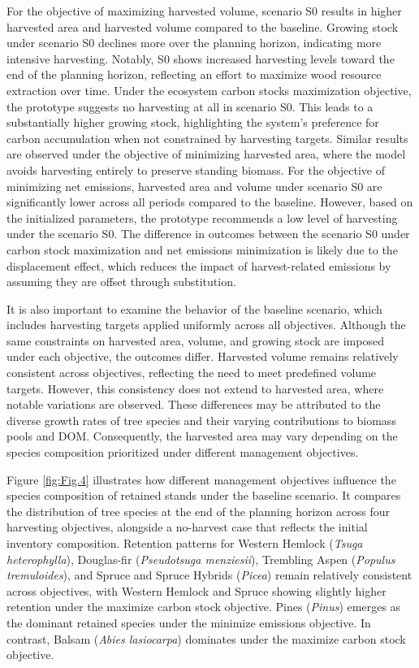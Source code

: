 \documentclass[preprint,12pt]{elsarticle}
\begin{document}
For the objective of maximizing harvested volume, scenario S0 results in higher harvested area and harvested volume compared to the baseline. Growing stock under scenario S0 declines more over the planning horizon, indicating more intensive harvesting. Notably, S0 shows increased harvesting levels toward the end of the planning horizon, reflecting an effort to maximize wood resource extraction over time. Under the ecosystem carbon stocks maximization objective, the prototype suggests no harvesting at all in scenario S0. This leads to a substantially higher growing stock, highlighting the system’s preference for carbon accumulation when not constrained by harvesting targets. Similar results are observed under the objective of minimizing harvested area, where the model avoids harvesting entirely to preserve standing biomass. For the objective of minimizing net emissions, harvested area and volume under scenario S0 are significantly lower across all periods compared to the baseline. However, based on the initialized parameters, the prototype recommends a low level of harvesting under the scenario S0. The difference in outcomes between the scenario S0 under  carbon stock maximization and net emissions minimization is likely due to the displacement effect, which reduces the impact of harvest-related emissions by assuming they are offset through substitution.

It is also important to examine the behavior of the baseline scenario, which includes harvesting targets applied uniformly across all objectives. Although the same constraints on harvested area, volume, and growing stock are imposed under each objective, the outcomes differ. Harvested volume remains relatively consistent across objectives, reflecting the need to meet predefined volume targets. However, this consistency does not extend to harvested area, where notable variations are observed. These differences may be attributed to the diverse growth rates of tree species and their varying contributions to biomass pools and DOM. Consequently, the harvested area may vary depending on the species composition prioritized under different management objectives.

Figure \ref{fig:Fig.4} illustrates how different management objectives influence the species composition of retained stands under the baseline scenario. It compares the distribution of tree species at the end of the planning horizon across four harvesting objectives, alongside a no-harvest case that reflects the initial inventory composition.
Retention patterns for Western Hemlock (\textit{Tsuga heterophylla}), Douglas-fir (\textit{Pseudotsuga menziesii}), Trembling Aspen (\textit{Populus tremuloides}), and Spruce and Spruce Hybrids (\textit{Picea}) remain relatively consistent across objectives, with Western Hemlock and Spruce showing slightly higher retention under the maximize carbon stock objective. Pines (\textit{Pinus}) emerges as the dominant retained species under the minimize emissions objective. In contrast, Balsam (\textit{Abies lasiocarpa}) dominates under the maximize carbon stock objective.
\end{document}

